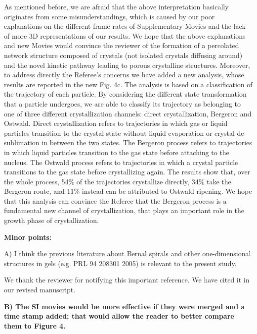 \documentclass[11pt,a4paper]{article}
\newenvironment{referee}%
{\bigskip\singlespacing\bf}%
{\par\bigskip}
\begin{document}
As mentioned before, we are afraid that the above interpretation basically originates from some misunderstandings, which is caused by our poor explanations on the different frame rates of Supplementary Movies and the lack of more 3D representations of our results. We hope that the above explanations and new Movies would convince the reviewer of the formation of a percolated network structure composed of crystals (not isolated crystals diffusing around) and the novel kinetic pathway leading to porous crystalline structures.
Moreover, to address directly the Referee's concerns we have added a new analysis, whose results are reported in the new Fig. 4c.
The analysis is based on a classification of the trajectory of
each particle. By considering the different state transformation that a particle undergoes, we are able to classify its trajectory as belonging to one of three different crystallization channels: direct crystallization, Bergeron and Ostwald. Direct crystallization refers to trajectories in
which gas or liquid particles transition to the crystal state without liquid evaporation or crystal de-sublimation in between the two states.
The Bergeron process refers to trajectories in which liquid particles transition to the gas state before attaching to the nucleus. The Ostwald
process refers to trajectories in which a crystal particle transitions to the gas state before crystallizing again.
The results show that, over the whole process, 54\% of the trajectories crystallize directly, 34\% take the Bergeron route, and
11\% instead can be attributed to Ostwald ripening. We hope that this analysis can convince the Referee that the Bergeron process is a
fundamental new channel of crystallization, that plays an important role in the growth phase of crystallization.


\begin{referee}
Minor points:

A) I think the previous literature about Bernal spirals and other one-dimensional structures in gels (e.g. PRL 94 208301 2005) is relevant to the present study.
\end{referee}

We thank the reviewer for notifying this important reference. We have cited it in our revised manuscript. 


\begin{referee}
B) The SI movies would be more effective if they were merged and a time stamp added; that would allow the reader to better compare them to Figure 4.
\end{referee}
\end{document}
